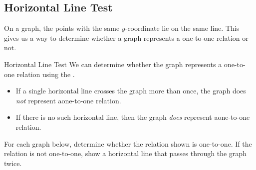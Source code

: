 \subsection{Horizontal Line Test} 
On a graph, the points with the same $y$-coordinate lie on the same \makeblank[1.25in] line. This gives us a way to determine whether a graph represents a one-to-one relation or not.
\begin{procedure}{Horizontal Line Test}
We can determine whether the graph represents a one-to-one relation using the .
\begin{itemize}
\item If a single horizontal line crosses the graph more than once, the graph does \emph{not} represent aone-to-one relation.
\item If there is no such horizontal line, then the graph \emph{does} represent a\linebreak one-to-one relation.
\end{itemize}
\end{procedure}
\begin{Example}
For each graph below, determine whether the relation shown is one-to-one. If the relation is not one-to-one, show a horizontal line that passes through the graph twice.
\begin{center}
\end{center}
\end{Example}